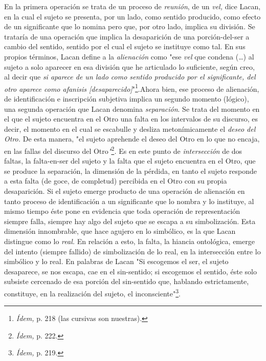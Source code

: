 En la primera operación se trata de un proceso de \emph{reunión}, de un
\emph{vel,} dice Lacan, en la cual el sujeto se presenta, por un lado,
como sentido producido, como efecto de un significante que lo nomina
pero que, por otro lado, implica su división\emph{.} Se trataría de una
operación que implica la desaparición de una porción-del-ser a cambio
del sentido, sentido por el cual el sujeto se instituye como tal. En sus
propios términos, Lacan define a la \emph{alienación} como "ese
\emph{vel} que condena (\dots) al sujeto a solo aparecer en esa
división que he articulado lo suficiente, según creo, al decir que
\emph{si aparece de un lado como sentido producido por el significante,
del otro aparece como afanisis {[}desaparecido{]}}"\footnote{\emph{Ídem,}
  p. 218 (las cursivas son nuestras).}.Ahora bien, ese proceso de
alienación, de identificación e inscripción subjetiva implica un segundo
momento (lógico), una segunda operación que Lacan denomina
\emph{separación}. Se trata del momento en el que el sujeto encuentra en
el Otro una falta en los intervalos de su discurso, es decir, el momento
en el cual se escabulle y desliza metonímicamente el \emph{deseo del
Otro.} De esta manera, "el sujeto aprehende el deseo del Otro en lo que
no encaja, en las fallas del discurso del
Otro\emph{"}\footnote{\emph{Ídem,} p. 222.}\emph{.} Es en este punto de
\emph{intersección} de dos faltas, la falta-en-ser del sujeto y la falta
que el sujeto encuentra en el Otro, que se produce la separación, la
dimensión de la pérdida, en tanto el sujeto responde a esta falta (de
goce, de completud) percibida en el Otro con su propia desaparición. Si
el sujeto emerge producto de una operación de alienación en tanto
proceso de identificación a un significante que lo nombra y lo
instituye, al mismo tiempo éste pone en evidencia que toda operación de
representación siempre falla, siempre hay algo del sujeto que se escapa
a su simbolización. Esta dimensión innombrable, que hace agujero en lo
simbólico, es la que Lacan distingue como lo \emph{real.} En relación a
esto, la falta, la hiancia ontológica, emerge del intento (siempre
fallido) de simbolización de lo real, en la intersección entre lo
simbólico y lo real. En palabras de Lacan "Si escogemos el ser, el
sujeto desaparece, se nos escapa, cae en el sin-sentido; si escogemos el
sentido, éste solo subsiste cercenado de esa porción del sin-sentido
que, hablando estrictamente, constituye, en la realización del sujeto,
el inconsciente"\footnote{\emph{Ídem,} p. 219.}.

